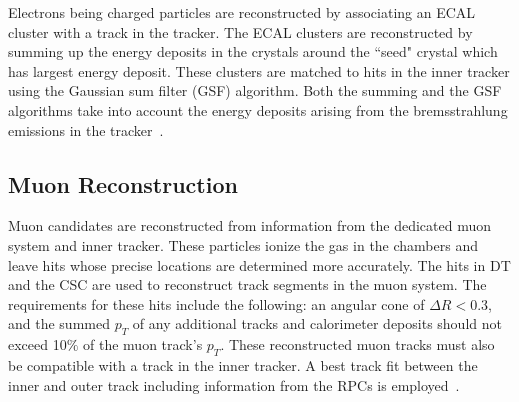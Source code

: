 Electrons being charged particles are reconstructed by associating an ECAL cluster with a track in the tracker. The ECAL clusters are reconstructed by summing up the energy deposits in the crystals around the ``seed" crystal which has largest energy deposit. These clusters are matched to hits in the inner tracker using the Gaussian sum filter (GSF) algorithm. Both the summing and the GSF algorithms take into account the energy deposits arising from the bremsstrahlung emissions in the tracker~\cite{Mukherjee:2021wzi}.


\subsection{Muon Reconstruction}

Muon candidates are reconstructed from information from the dedicated muon system and inner tracker. These particles ionize the gas in the chambers and leave hits whose precise locations are determined more accurately. The hits in DT and the CSC are used to reconstruct track segments in the muon system. The requirements for these hits include the following: an angular cone of $\Delta R < 0.3$, and the summed $p_{T}$ of any additional tracks and calorimeter deposits should not exceed 10$\%$ of the muon track's $p_{T}$. These reconstructed muon tracks must also be compatible with a track in the inner tracker. A best track fit between the inner and outer track including information from the RPCs is employed~\cite{CMS:2018rym}. 



